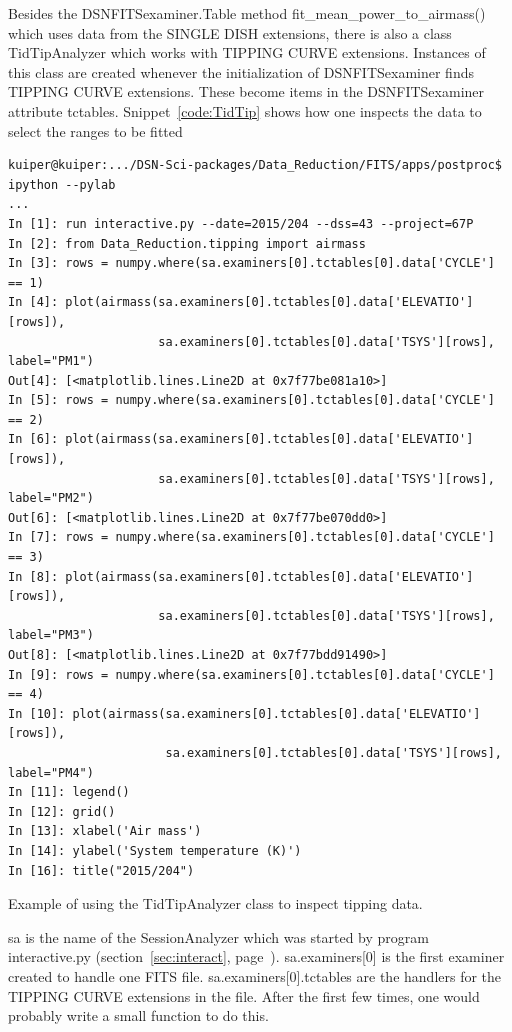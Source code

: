 \documentclass[letterpaper,11pt]{book}
\begin{document}
Besides the {\ttfamily DSNFITSexaminer.Table} method 
{\ttfamily fit\_mean\_power\_to\_airmass()} which uses data from the
SINGLE DISH extensions, there is also a class {\ttfamily TidTipAnalyzer}
which works with TIPPING CURVE extensions. Instances of this class are created
whenever the initialization of {\ttfamily DSNFITSexaminer} finds
TIPPING CURVE extensions. These become items in the {\ttfamily DSNFITSexaminer}
attribute {\ttfamily tctables}. Snippet~\ref{code:TidTip} shows how one 
inspects the data to select the ranges to be fitted
\begin{code}[h!tb]
\begin{center}
{\scriptsize \begin{verbatim}
kuiper@kuiper:.../DSN-Sci-packages/Data_Reduction/FITS/apps/postproc$ ipython --pylab
...
In [1]: run interactive.py --date=2015/204 --dss=43 --project=67P
In [2]: from Data_Reduction.tipping import airmass
In [3]: rows = numpy.where(sa.examiners[0].tctables[0].data['CYCLE'] == 1)
In [4]: plot(airmass(sa.examiners[0].tctables[0].data['ELEVATIO'][rows]),
                     sa.examiners[0].tctables[0].data['TSYS'][rows],      label="PM1")
Out[4]: [<matplotlib.lines.Line2D at 0x7f77be081a10>]
In [5]: rows = numpy.where(sa.examiners[0].tctables[0].data['CYCLE'] == 2)
In [6]: plot(airmass(sa.examiners[0].tctables[0].data['ELEVATIO'][rows]),
                     sa.examiners[0].tctables[0].data['TSYS'][rows],      label="PM2")
Out[6]: [<matplotlib.lines.Line2D at 0x7f77be070dd0>]
In [7]: rows = numpy.where(sa.examiners[0].tctables[0].data['CYCLE'] == 3)
In [8]: plot(airmass(sa.examiners[0].tctables[0].data['ELEVATIO'][rows]),
                     sa.examiners[0].tctables[0].data['TSYS'][rows],      label="PM3")
Out[8]: [<matplotlib.lines.Line2D at 0x7f77bdd91490>]
In [9]: rows = numpy.where(sa.examiners[0].tctables[0].data['CYCLE'] == 4)
In [10]: plot(airmass(sa.examiners[0].tctables[0].data['ELEVATIO'][rows]),
                      sa.examiners[0].tctables[0].data['TSYS'][rows],     label="PM4")
In [11]: legend()
In [12]: grid()
In [13]: xlabel('Air mass')
In [14]: ylabel('System temperature (K)')
In [16]: title("2015/204")\end{verbatim}
}\caption[{\ttfamily TidTipAnalyzer example}]{\label{code:TidTip}
Example of using the {\ttfamily TidTipAnalyzer} class to inspect tipping
data.}
\end{center}
\end{code}
{\ttfamily sa} is the name of the {\ttfamily SessionAnalyzer} which was started
by program {\ttfamily interactive.py} (section~\ref{sec:interact},
page~\pageref{sec:interact}). {\ttfamily sa.examiners[0]} is the first
examiner created to handle one FITS file. {\ttfamily sa.examiners[0].tctables}
are the handlers for the TIPPING CURVE extensions in the file.
After the first few times, one would probably write a small function to do this.
\end{document}
